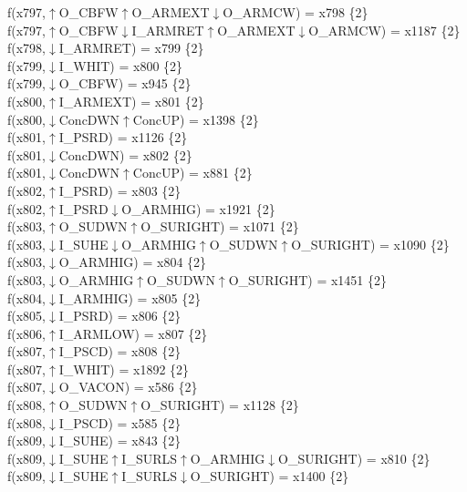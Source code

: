 f(x797,$\uparrow$O\_CBFW$\uparrow$O\_ARMEXT$\downarrow$O\_ARMCW) = x798 \{2\} \\  
f(x797,$\uparrow$O\_CBFW$\downarrow$I\_ARMRET$\uparrow$O\_ARMEXT$\downarrow$O\_ARMCW) = x1187 \{2\} \\  
f(x798,$\downarrow$I\_ARMRET) = x799 \{2\} \\  
f(x799,$\downarrow$I\_WHIT) = x800 \{2\} \\  
f(x799,$\downarrow$O\_CBFW) = x945 \{2\} \\  
f(x800,$\uparrow$I\_ARMEXT) = x801 \{2\} \\  
f(x800,$\downarrow$ConcDWN$\uparrow$ConcUP) = x1398 \{2\} \\  
f(x801,$\uparrow$I\_PSRD) = x1126 \{2\} \\  
f(x801,$\downarrow$ConcDWN) = x802 \{2\} \\  
f(x801,$\downarrow$ConcDWN$\uparrow$ConcUP) = x881 \{2\} \\  
f(x802,$\uparrow$I\_PSRD) = x803 \{2\} \\  
f(x802,$\uparrow$I\_PSRD$\downarrow$O\_ARMHIG) = x1921 \{2\} \\  
f(x803,$\uparrow$O\_SUDWN$\uparrow$O\_SURIGHT) = x1071 \{2\} \\  
f(x803,$\downarrow$I\_SUHE$\downarrow$O\_ARMHIG$\uparrow$O\_SUDWN$\uparrow$O\_SURIGHT) = x1090 \{2\} \\  
f(x803,$\downarrow$O\_ARMHIG) = x804 \{2\} \\  
f(x803,$\downarrow$O\_ARMHIG$\uparrow$O\_SUDWN$\uparrow$O\_SURIGHT) = x1451 \{2\} \\  
f(x804,$\downarrow$I\_ARMHIG) = x805 \{2\} \\  
f(x805,$\downarrow$I\_PSRD) = x806 \{2\} \\  
f(x806,$\uparrow$I\_ARMLOW) = x807 \{2\} \\  
f(x807,$\uparrow$I\_PSCD) = x808 \{2\} \\  
f(x807,$\uparrow$I\_WHIT) = x1892 \{2\} \\  
f(x807,$\downarrow$O\_VACON) = x586 \{2\} \\  
f(x808,$\uparrow$O\_SUDWN$\uparrow$O\_SURIGHT) = x1128 \{2\} \\  
f(x808,$\downarrow$I\_PSCD) = x585 \{2\} \\  
f(x809,$\downarrow$I\_SUHE) = x843 \{2\} \\  
f(x809,$\downarrow$I\_SUHE$\uparrow$I\_SURLS$\uparrow$O\_ARMHIG$\downarrow$O\_SURIGHT) = x810 \{2\} \\  
f(x809,$\downarrow$I\_SUHE$\uparrow$I\_SURLS$\downarrow$O\_SURIGHT) = x1400 \{2\} \\  
